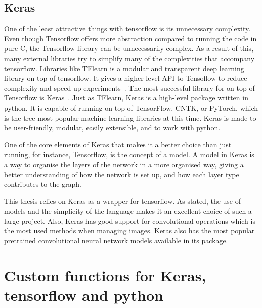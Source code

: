 \subsection{Keras}
One of the least attractive things with tensorflow is its unnecessary complexity.  Even though Tensorflow offers more abstraction compared to running the code in pure C, the Tensorflow library can be unnecessarily complex. As a result of this, many external libraries try to simplify many of the complexities that accompany tensorflow. 
Libraries like TFlearn is a modular and transparent deep learning library on top of tensorflow. It gives a higher-level API to Tensoflow to reduce complexity and speed up experiments~\cite{tflearn2016}.
The most successful library for on top of Tensorflow is Keras~\cite{Keras.io}. 
Just as TFlearn, Keras is a high-level package written in python. It is capable of running on top of TensorFlow, CNTK, or PyTorch, which is the tree most popular machine learning libraries at this time.  Keras is made to be user-friendly, modular, easily extensible, and to work with python.

One of the core elements of Keras that makes it a better choice than just running, for instance, Tensorflow, is the concept of a model. A model in Keras is a way to organise the layers of the network in a more organised way, giving a better understanding of how the network is set up, and how each layer type contributes to the graph. 

This thesis relies on Keras as a wrapper for tensorflow. As stated, the use of models and the simplicity of the language makes it an excellent choice of such a large project. Also, Keras has good support for convolutional operations which is the most used methods when managing images. Keras also has the most popular pretrained convolutional neural network models available in its package.





    
\section{Custom functions for Keras, tensorflow and python}
